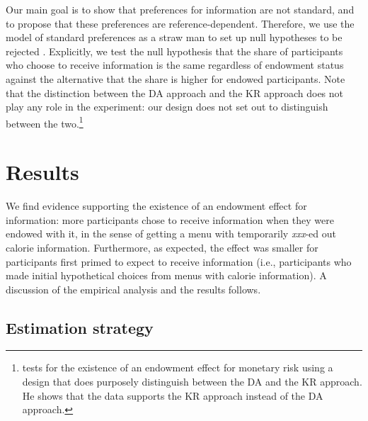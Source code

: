 \documentclass[12pt]{article}
\begin{document}
Our main goal is to show that preferences for information are not standard, and to propose that these preferences are reference-dependent. Therefore, we use the model of standard preferences as a straw man to set up null hypotheses to be rejected \citet{dellavignaChapterStructuralBehavioral2018}. Explicitly, we test the null hypothesis that the share of participants who choose to receive information is the same regardless of endowment status against the alternative that the share is higher for endowed participants. Note that the distinction between the DA approach and the KR approach does not play any role in the experiment: our design does not set out to distinguish between the two.\footnote{\citet{sprengerEndowmentEffectRisk2015} tests for the existence of an endowment effect for monetary risk using a design that does purposely distinguish between the DA and the KR approach. He shows that the data supports the KR approach instead of the DA approach.}

\section{Results}

We find evidence supporting the existence of an endowment effect for information: more participants chose to receive information when they were endowed with it, in the sense of getting a menu with temporarily \emph{xxx}-ed out calorie information. Furthermore, as expected, the effect was smaller for participants first primed to expect to receive information (i.e., participants who made initial hypothetical choices from menus with calorie information). A discussion of the empirical analysis and the results follows.

\subsection{Estimation strategy}
\end{document}
